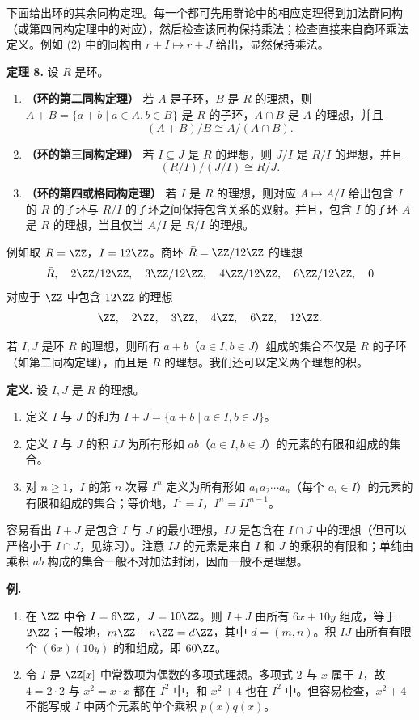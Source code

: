 下面给出环的其余同构定理。每一个都可先用群论中的相应定理得到加法群同构（或第四同构定理中的对应），然后检查该同构保持乘法；检查直接来自商环乘法定义。例如 (2) 中的同构由 $r+I\mapsto r+J$ 给出，显然保持乘法。

\medskip
\noindent\textbf{定理 8.} 设 $R$ 是环。
\begin{enumerate}[label=(\arabic*)]
  \item \textbf{（环的第二同构定理）} 若 $A$ 是子环，$B$ 是 $R$ 的理想，则 $A+B=\{a+b\mid a\in A,b\in B\}$ 是 $R$ 的子环，$A\cap B$ 是 $A$ 的理想，并且
  \[
    (A+B)/B\cong A/(A\cap B).
  \]
  \item \textbf{（环的第三同构定理）} 若 $I\subseteq J$ 是 $R$ 的理想，则 $J/I$ 是 $R/I$ 的理想，并且
  \[
    (R/I)/(J/I)\cong R/J.
  \]
  \item \textbf{（环的第四或格同构定理）} 若 $I$ 是 $R$ 的理想，则对应 $A\mapsto A/I$ 给出包含 $I$ 的 $R$ 的子环与 $R/I$ 的子环之间保持包含关系的双射。并且，包含 $I$ 的子环 $A$ 是 $R$ 的理想，当且仅当 $A/I$ 是 $R/I$ 的理想。
\end{enumerate}

例如取 $R=\ZZ$，$I=12\ZZ$。商环 $\bar R=\ZZ/12\ZZ$ 的理想
\[
  \bar R,
  \quad 2\ZZ/12\ZZ,
  \quad 3\ZZ/12\ZZ,
  \quad 4\ZZ/12\ZZ,
  \quad 6\ZZ/12\ZZ,
  \quad 0
\]
对应于 $\ZZ$ 中包含 $12\ZZ$ 的理想
\[
  \ZZ,
  \quad 2\ZZ,
  \quad 3\ZZ,
  \quad 4\ZZ,
  \quad 6\ZZ,
  \quad 12\ZZ.
\]

若 $I,J$ 是环 $R$ 的理想，则所有 $a+b$（$a\in I,b\in J$）组成的集合不仅是 $R$ 的子环（如第二同构定理），而且是 $R$ 的理想。我们还可以定义两个理想的积。

\medskip
\noindent\textbf{定义.} 设 $I,J$ 是 $R$ 的理想。
\begin{enumerate}[label=(\arabic*)]
  \item 定义 $I$ 与 $J$ 的和为 $I+J=\{a+b\mid a\in I,b\in J\}$。
  \item 定义 $I$ 与 $J$ 的积 $IJ$ 为所有形如 $ab$（$a\in I,b\in J$）的元素的有限和组成的集合。
  \item 对 $n\geq1$，$I$ 的第 $n$ 次幂 $I^n$ 定义为所有形如 $a_1a_2\cdots a_n$（每个 $a_i\in I$）的元素的有限和组成的集合；等价地，$I^1=I$，$I^n=I I^{n-1}$。
\end{enumerate}

容易看出 $I+J$ 是包含 $I$ 与 $J$ 的最小理想，$IJ$ 是包含在 $I\cap J$ 中的理想（但可以严格小于 $I\cap J$，见练习）。注意 $IJ$ 的元素是来自 $I$ 和 $J$ 的乘积的有限和；单纯由乘积 $ab$ 构成的集合一般不对加法封闭，因而一般不是理想。

\medskip
\noindent\textbf{例.}
\begin{enumerate}[label=(\arabic*)]
  \item 在 $\ZZ$ 中令 $I=6\ZZ$，$J=10\ZZ$。则 $I+J$ 由所有 $6x+10y$ 组成，等于 $2\ZZ$；一般地，$m\ZZ+n\ZZ=d\ZZ$，其中 $d=(m,n)$。积 $IJ$ 由所有有限个 $(6x)(10y)$ 的和组成，即 $60\ZZ$。
  \item 令 $I$ 是 $\ZZ[x]$ 中常数项为偶数的多项式理想。多项式 $2$ 与 $x$ 属于 $I$，故 $4=2\cdot2$ 与 $x^2=x\cdot x$ 都在 $I^2$ 中，和 $x^2+4$ 也在 $I^2$ 中。但容易检查，$x^2+4$ 不能写成 $I$ 中两个元素的单个乘积 $p(x)q(x)$。
\end{enumerate}

